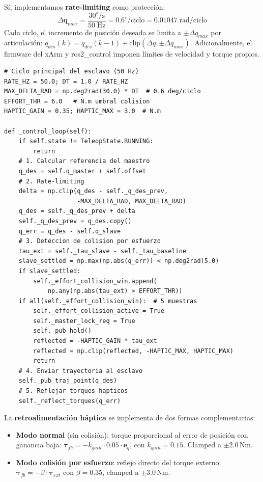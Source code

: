 \documentclass[journal,10pt,twoside]{IEEEtran}
\begin{document}
Sí, implementamos \textbf{rate-limiting} como protección:
\[
  \Delta\bm{q}_{max} = \frac{30^\circ/\text{s}}{50\;\text{Hz}} = 0{.}6^\circ/\text{ciclo} = 0{.}01047\;\text{rad/ciclo}
\]
Cada ciclo, el incremento de posición deseada se limita a
$\pm\Delta q_{max}$ por articulación:
$q_{des}(k)=q_{des}(k-1)+\text{clip}(\Delta q, \pm\Delta q_{max})$.
Adicionalmente, el firmware del xArm y ros2\_control imponen límites
de velocidad y torque propios.

\begin{lstlisting}[caption={Ciclo de control del robot Esclavo (extracto de bilateral\_teleop.py)},
                   label={lst:slave}]
# Ciclo principal del esclavo (50 Hz) 
RATE_HZ = 50.0; DT = 1.0 / RATE_HZ
MAX_DELTA_RAD = np.deg2rad(30.0) * DT  # 0.6 deg/ciclo
EFFORT_THR = 6.0   # N.m umbral colision
HAPTIC_GAIN = 0.35; HAPTIC_MAX = 3.0  # N.m

def _control_loop(self):
    if self.state != TeleopState.RUNNING:
        return
    # 1. Calcular referencia del maestro
    q_des = self.q_master + self.offset
    # 2. Rate-limiting
    delta = np.clip(q_des - self._q_des_prev,
                    -MAX_DELTA_RAD, MAX_DELTA_RAD)
    q_des = self._q_des_prev + delta
    self._q_des_prev = q_des.copy()
    q_err = q_des - self.q_slave
    # 3. Deteccion de colision por esfuerzo
    tau_ext = self._tau_slave - self._tau_baseline
    slave_settled = np.max(np.abs(q_err)) < np.deg2rad(5.0)
    if slave_settled:
        self._effort_collision_win.append(
            np.any(np.abs(tau_ext) > EFFORT_THR))
    if all(self._effort_collision_win):  # 5 muestras
        self._effort_collision_active = True
        self._master_lock_req = True
        self._pub_hold()
        reflected = -HAPTIC_GAIN * tau_ext
        reflected = np.clip(reflected, -HAPTIC_MAX, HAPTIC_MAX)
        return
    # 4. Enviar trayectoria al esclavo
    self._pub_traj_point(q_des)
    # 5. Reflejar torques hapticos
    self._reflect_torques(q_err)
\end{lstlisting}

La \textbf{retroalimentación háptica} se implementa de dos formas
complementarias:

\begin{itemize}
  \item \textbf{Modo normal} (sin colisión): torque proporcional al
        error de posición con ganancia baja:
        $\bm{\tau}_{fb}=-k_{gain}\cdot 0{.}05\cdot\bm{e}_q$,
        con $k_{gain}=0{.}15$. Clamped a $\pm2{.}0$\,Nm.
  \item \textbf{Modo colisión por esfuerzo}: reflejo directo del torque
        externo: $\bm{\tau}_{fb}=-\beta\cdot\bm{\tau}_{ext}$ con
        $\beta=0{.}35$, clamped a $\pm3{.}0$\,Nm.
\end{itemize}
\end{document}
